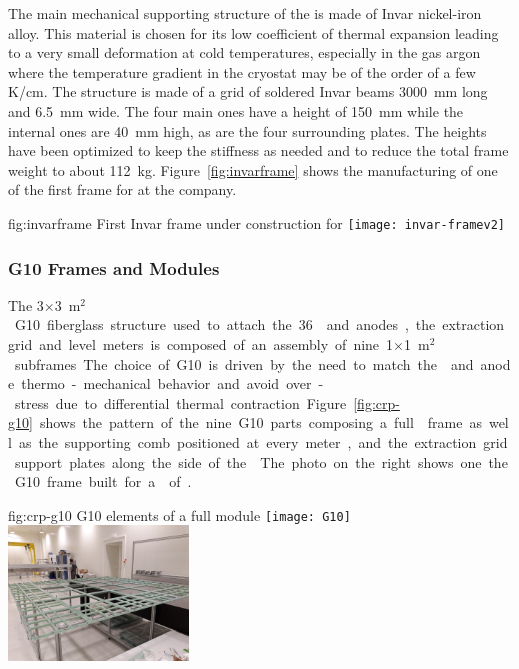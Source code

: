 The main mechanical supporting structure of the  is made of Invar nickel-iron alloy. This material is chosen for its low coefficient of thermal expansion leading to a very small deformation at cold temperatures, especially in the gas argon where the temperature gradient in the cryostat may be of the order of a few \si{K/cm}.
The structure is made of a grid of soldered Invar beams \SI{3000}{mm} long and \SI{6.5}{mm} wide. The four main ones have a height of \SI{150}{mm} while the internal ones are \SI{40}{mm} high, as are the four surrounding plates. The heights have been optimized to keep the stiffness as needed and to reduce the total frame weight to about \SI{112}{kg}.
 Figure~\ref{fig:invarframe} shows the manufacturing of one of the first  frame for  at the company.
\begin{dunefigure}{fig:invarframe}
{First  Invar frame under construction for }
\texttt{[image: invar-framev2]}
\end{dunefigure}
 \subsubsection{G10 Frames and Modules}
\label{sec:invar-frame}

The \num{3}$\times$\SI{3}{m$^{2}$}  G10 fiberglass structure used to attach the \num{36}  and anodes, the extraction grid and level meters is composed of an assembly of nine \num{1}$\times$\SI{1}{m$^{2}$} subframes. The choice of G10 is driven by the need to match the  and anode thermo-mechanical behavior and avoid over-stress due to differential thermal contraction. 
Figure~\ref{fig:crp-g10} shows the pattern of the nine G10 parts composing a full  frame as well as the supporting comb positioned at every meter, and the extraction grid support plates along the side of the .The photo on the right shows one the G10 frame built for a  of .

\begin{dunefigure}{fig:crp-g10}
{G10 elements of a full  module}
\texttt{[image: G10]}
\includegraphics[width=0.36\textwidth]{graphics/G10-frameassembled}
\end{dunefigure}

